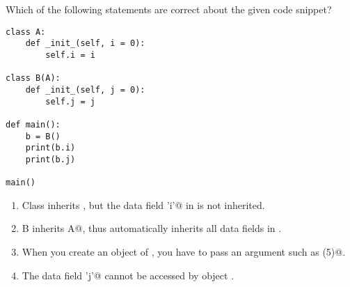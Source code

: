 \question
Which of the following statements are correct about the given code snippet?
\begin{lstlisting}
class A:
    def _init_(self, i = 0):
        self.i = i

class B(A):
    def _init_(self, j = 0):
        self.j = j

def main():
    b = B()
    print(b.i)
    print(b.j)

main()
\end{lstlisting}

\begin{enumerate}
\item Class \lstinline@B@ inherits \lstinline@A@, but the data field \lstinline@'i'@ in \lstinline@A@ is not inherited.
\item \lstinline@Class B inherits A@, thus automatically inherits all data fields in \lstinline@A@.
\item When you create an object of \lstinline@B@, you have to pass an argument such as \lstinline@B(5)@.
\item The data field \lstinline@'j'@ cannot be accessed by object \lstinline@b@.
\end{enumerate}

